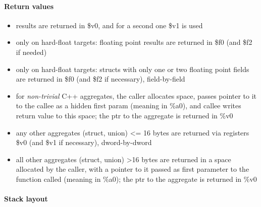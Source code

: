 \paragraph{Return values}

\begin{itemize}
\item results are returned in \$v0, and for a second one \$v1 is used
\item only on hard-float targets: floating point results are returned in \$f0 (and \$f2 if needed)
\item only on hard-float targets: structs with only one or two floating point fields are returned in \$f0 (and \$f2 if necessary), field-by-field
\item for {\it non-trivial} C++ aggregates, the caller allocates space, passes pointer to it to the callee as a hidden first param
(meaning in \%a0), and callee writes return value to this space; the ptr to the aggregate is returned in \%v0
\item any other aggregates (struct, union) \textless= 16 bytes are returned via registers \$v0 (and \$v1 if necessary), dword-by-dword
\item all other aggregates (struct, union) \textgreater 16 bytes are returned in a space allocated by the caller, with a pointer to it
passed as first parameter to the function called (meaning in \%a0); the ptr to the aggregate is returned in \%v0
\end{itemize}


\paragraph{Stack layout}

